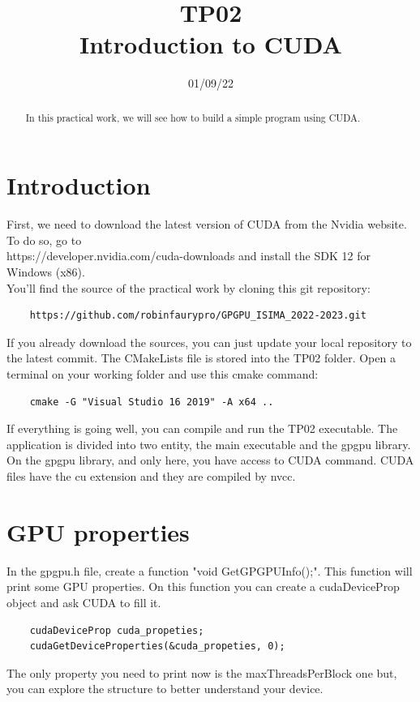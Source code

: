 \documentclass{article}
\begin{document}
\title{TP02\\Introduction to CUDA}
\date{01/09/22}
\maketitle

\begin{abstract}
	In this practical work, we will see how to build a simple program using CUDA.
\end{abstract}


\section{Introduction}
First, we need to download the latest version of CUDA from the Nvidia website. To do so, go to \\https://developer.nvidia.com/cuda-downloads and install the SDK 12 for Windows (x86).\\
You'll find the source of the practical work by cloning this git repository:
\begin{lstlisting}
	https://github.com/robinfaurypro/GPGPU_ISIMA_2022-2023.git
\end{lstlisting}
If you already download the sources, you can just update your local repository to the latest commit. The CMakeLists file is stored into the TP02 folder. Open a terminal on your working folder and use this cmake command:
\begin{lstlisting}
	cmake -G "Visual Studio 16 2019" -A x64 ..
\end{lstlisting}
If everything is going well, you can compile and run the TP02 executable. The application is divided into two entity, the main executable and the gpgpu library. On the gpgpu library, and only here, you have access to CUDA command. CUDA files have the cu extension and they are compiled by nvcc.

\section{GPU properties}
In the gpgpu.h file, create a function "void GetGPGPUInfo();". This function will print some GPU properties. On this function you can create a cudaDeviceProp object and ask CUDA to fill it.
\begin{lstlisting}
	cudaDeviceProp cuda_propeties;
	cudaGetDeviceProperties(&cuda_propeties, 0);
\end{lstlisting}
The only property you need to print now is the maxThreadsPerBlock one but, you can explore the structure to better understand your device.
\end{document}
